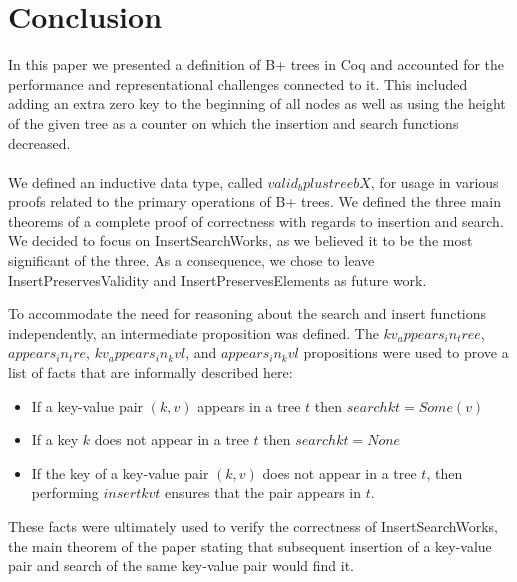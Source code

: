 \section{Conclusion}
\label{sec:Conclusion}
In this paper we presented a definition of B+ trees in Coq and accounted for the performance and representational challenges connected to it. This included adding an extra zero key to the beginning of all nodes as well as using the height of the given tree as a counter on which the insertion and search functions decreased. 
\paragraph{}
We defined an inductive data type, called $valid_bplustree b X$, for usage in various proofs related to the primary operations of B+ trees. We defined the three main theorems of a complete proof of correctness with regards to insertion and search. We decided to focus on InsertSearchWorks, as we believed it to be the most significant of the three. As a consequence, we chose to leave InsertPreservesValidity and InsertPreservesElements as future work.

To accommodate the need for reasoning about the search and insert functions independently, an intermediate proposition was defined. The $kv_appears_in_tree$, $appears_in_tre$, $kv_appears_in_kvl$, and $appears_in_kvl$ propositions were used to prove a list of facts that are informally described here:

\begin{itemize}
	\item If a key-value pair $(k, v)$ appears in a tree $t$ then $search k t = Some (v)$
	\item If a key $k$ does not appear in a tree $t$ then $search k t = None$
	\item If the key of a key-value pair $(k, v)$ does not appear in a tree $t$, then performing $insert k v t$ ensures that the pair appears in $t$.
\end{itemize} 

These facts were ultimately used to verify the correctness of InsertSearchWorks, the main theorem of the paper stating that subsequent insertion of a key-value pair and search of the same key-value pair would find it.
